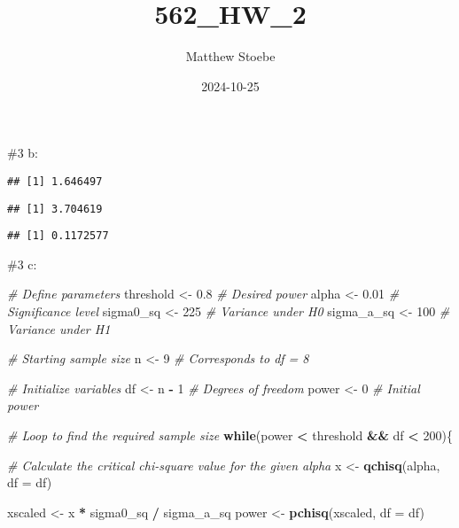 \documentclass[
]{article}
\title{562\_HW\_2}
\author{Matthew Stoebe}
\date{2024-10-25}
\newenvironment{Shaded}{\begin{snugshade}}{\end{snugshade}}
\newcommand{\AttributeTok}[1]{\textcolor[rgb]{0.13,0.29,0.53}{#1}}
\newcommand{\CommentTok}[1]{\textcolor[rgb]{0.56,0.35,0.01}{\textit{#1}}}
\newcommand{\ControlFlowTok}[1]{\textcolor[rgb]{0.13,0.29,0.53}{\textbf{#1}}}
\newcommand{\DecValTok}[1]{\textcolor[rgb]{0.00,0.00,0.81}{#1}}
\newcommand{\FloatTok}[1]{\textcolor[rgb]{0.00,0.00,0.81}{#1}}
\newcommand{\FunctionTok}[1]{\textcolor[rgb]{0.13,0.29,0.53}{\textbf{#1}}}
\newcommand{\NormalTok}[1]{#1}
\newcommand{\OtherTok}[1]{\textcolor[rgb]{0.56,0.35,0.01}{#1}}
\newcommand{\SpecialCharTok}[1]{\textcolor[rgb]{0.81,0.36,0.00}{\textbf{#1}}}
\begin{document}
\maketitle

\#3 b:

\begin{verbatim}
## [1] 1.646497
\end{verbatim}

\begin{verbatim}
## [1] 3.704619
\end{verbatim}

\begin{verbatim}
## [1] 0.1172577
\end{verbatim}

\#3 c:

\begin{Shaded}
\begin{Highlighting}[]
\CommentTok{\# Define parameters}
\NormalTok{threshold }\OtherTok{\textless{}{-}} \FloatTok{0.8}          \CommentTok{\# Desired power}
\NormalTok{alpha }\OtherTok{\textless{}{-}} \FloatTok{0.01}             \CommentTok{\# Significance level}
\NormalTok{sigma0\_sq }\OtherTok{\textless{}{-}} \DecValTok{225}          \CommentTok{\# Variance under H0}
\NormalTok{sigma\_a\_sq }\OtherTok{\textless{}{-}} \DecValTok{100}         \CommentTok{\# Variance under H1}

\CommentTok{\# Starting sample size}
\NormalTok{n }\OtherTok{\textless{}{-}} \DecValTok{9}                    \CommentTok{\# Corresponds to df = 8}

\CommentTok{\# Initialize variables}
\NormalTok{df }\OtherTok{\textless{}{-}}\NormalTok{ n }\SpecialCharTok{{-}} \DecValTok{1}        \CommentTok{\# Degrees of freedom}
\NormalTok{power }\OtherTok{\textless{}{-}} \DecValTok{0}                 \CommentTok{\# Initial power}

\CommentTok{\# Loop to find the required sample size}
\ControlFlowTok{while}\NormalTok{(power }\SpecialCharTok{\textless{}}\NormalTok{ threshold }\SpecialCharTok{\&\&}\NormalTok{ df }\SpecialCharTok{\textless{}} \DecValTok{200}\NormalTok{)\{}
  
  \CommentTok{\# Calculate the critical chi{-}square value for the given alpha}
\NormalTok{  x }\OtherTok{\textless{}{-}} \FunctionTok{qchisq}\NormalTok{(alpha, }\AttributeTok{df =}\NormalTok{ df)}
  
\NormalTok{  xscaled }\OtherTok{\textless{}{-}}\NormalTok{ x }\SpecialCharTok{*}\NormalTok{ sigma0\_sq }\SpecialCharTok{/}\NormalTok{ sigma\_a\_sq}
\NormalTok{  power }\OtherTok{\textless{}{-}} \FunctionTok{pchisq}\NormalTok{(xscaled, }\AttributeTok{df =}\NormalTok{ df)}


\end{Highlighting}
\end{Shaded}
\end{document}
